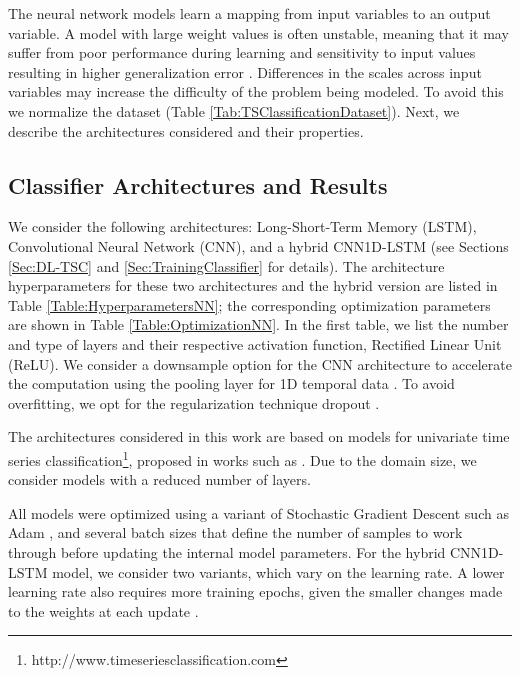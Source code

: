 The neural network models learn a mapping from input variables to an output variable. A model with large weight values is often unstable, meaning that it may suffer from poor performance during learning and sensitivity to input values resulting in higher generalization error \cite{Lecun1998}. Differences in the scales across input variables may increase the difficulty of the problem being modeled. To avoid this we normalize the dataset (Table \ref{Tab:TSClassificationDataset}). Next, we describe the architectures considered and their properties.

\subsection{Classifier Architectures and Results}
\label{Sec:TSC_NN_Results}

We consider the following architectures: Long-Short-Term Memory (LSTM), Convolutional Neural Network (CNN), and a hybrid CNN1D-LSTM (see Sections \ref{Sec:DL-TSC} and \ref{Sec:TrainingClassifier} for details). The architecture hyperparameters for these two architectures and the hybrid version are listed in Table \ref{Table:HyperparametersNN}; the corresponding optimization parameters are shown in Table \ref{Table:OptimizationNN}. In the first table, we list the number and type of layers and their respective activation function, Rectified Linear Unit (ReLU). We consider a downsample option for the CNN architecture to accelerate the computation using the pooling layer for 1D temporal data \cite{Gholamalinezhad2020}. To avoid overfitting, we opt for the regularization technique dropout \cite{Srivastava2014, Baldi2013}. 

The architectures considered in this work are based on models for univariate time series classification\footnote{http://www.timeseriesclassification.com}, proposed in works such as \cite{Bagnall2017a, Fawaz2019}. Due to the domain size, we consider models with a reduced number of layers.

All models were optimized using a variant of Stochastic Gradient Descent such as Adam \cite{Kingma2015}, and several batch sizes that define the number of samples to work through before updating the internal model parameters. For the hybrid CNN1D-LSTM model, we consider two variants, which vary on the learning rate. A lower learning rate also requires more training epochs, given the smaller changes made to the weights at each update \cite{Patterson2017}.

